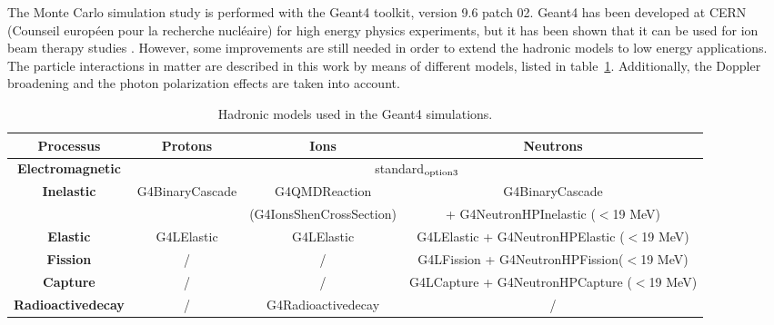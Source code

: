 The Monte Carlo simulation study is performed with the Geant4 toolkit, version 9.6 patch 02. Geant4 has been developed at CERN (Counseil européen pour la recherche nucléaire) for high energy physics experiments, but it has been shown that it can be used for ion beam therapy studies \cite{cirrone_hadrontherapy_2011,toshito_new_2010}. However, some improvements are still needed in order to extend the hadronic models to low energy applications\cite{dedes_assessment_2014}.\\
The particle interactions in matter are described in this work by means of different models, listed in table~\ref{table:table_modele_physic_CC_simulation_Hadronth}. Additionally, the Doppler broadening and the photon polarization effects are taken into account.\\ 


\begin{table}[ht]
\label{physlist_ion}
\caption{Hadronic models used in the Geant4 simulations.}
\begin{scriptsize}
\begin{center}
\renewcommand{\arraystretch}{1.2}
\begin{tabular} {cccc}\hline
\textbf{Processus} & \textbf{Protons} & \textbf{Ions} & \textbf{Neutrons} \\ \hline 
\textbf{Electromagnetic} & \multicolumn{3}{c}{standard$_{\rm{option3}}$} \\ %
\textbf{Inelastic} & G4BinaryCascade & G4QMDReaction  &  G4BinaryCascade  \\ 
 & & (G4IonsShenCrossSection)&+ G4NeutronHPInelastic ($<$19 MeV)\\ %
\textbf{Elastic} & G4LElastic & G4LElastic & G4LElastic + G4NeutronHPElastic ($<$19 MeV)\\ %
\textbf{Fission} & / & / & G4LFission + G4NeutronHPFission($<$19 MeV) \\ %
\textbf{Capture} & / & / & G4LCapture +  G4NeutronHPCapture ($<$19 MeV) \\ %
\textbf{Radioactivedecay} & / & G4Radioactivedecay & / \\ \hline
\end{tabular}
\end{center}
\end{scriptsize}
\label{table:table_modele_physic_CC_simulation_Hadronth}
\end{table}

